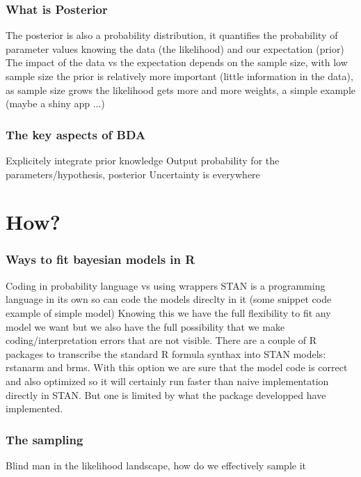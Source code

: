 \documentclass{beamer}
\begin{document}
  \begin{frame}
  \frametitle{\bf What is Posterior}
  
  The posterior is also a probability distribution, it quantifies the probability of parameter values knowing the data (the likelihood) and our expectation (prior)
  The impact of the data vs the expectation depends on the sample size, with low sample size the prior is relatively more important (little information in the data), as
  sample size grows the likelihood gets more and more weights, a simple example (maybe a shiny app ...)
  
  
 
 
\begin{frame}
 \frametitle{\bf The key aspects of BDA}
 
 Explicitely integrate prior knowledge 
 Output probability for the parameters/hypothesis, posterior
 Uncertainty is everywhere
 
\end{frame}

\section{How?}

 \begin{frame}
  \frametitle{\bf Ways to fit bayesian models in R}
  
  Coding in probability language vs using wrappers
  STAN is a programming language in its own so can code the models direclty in it (some snippet code example of simple model)
  Knowing this we have the full flexibility to fit any model we want but we also have the full possibility that we make coding/interpretation
  errors that are not visible.
  There are a couple of R packages to transcribe the standard R formula synthax into STAN models: rstanarm and brms. With this option we are sure that the model
  code is correct and also optimized so it will certainly run faster than naive implementation directly in STAN. But one is limited by what the package developped have
  implemented. 
  
 \end{frame}

  \begin{frame}
  \frametitle{\bf The sampling}
  
  Blind man in the likelihood landscape, how do we effectively sample it
  
 \end{frame}
 

\end{frame}
\end{document}

